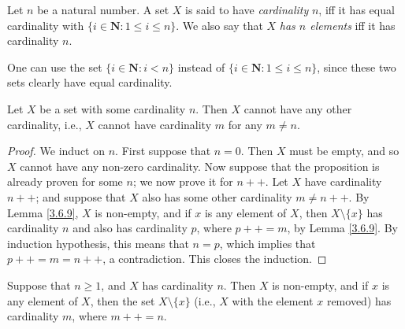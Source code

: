 \begin{definition}\label{3.6.5}
Let \(n\) be a natural number.
A set \(X\) is said to have \emph{cardinality} \(n\), iff it has equal cardinality with \(\{i \in \mathbf{N} : 1 \leq i \leq n\}\).
We also say that \(X\) \emph{has \(n\) elements} iff it has cardinality \(n\).
\end{definition}

\begin{remark}\label{3.6.6}
One can use the set \(\{i \in \mathbf{N} : i < n\}\) instead of \(\{i \in \mathbf{N} : 1 \leq i \leq n\}\), since these two sets clearly have equal cardinality.
\end{remark}

\setcounter{theorem}{7}
\begin{proposition}\label{3.6.8}
Let \(X\) be a set with some cardinality \(n\).
Then \(X\) cannot have any other cardinality, i.e., \(X\) cannot have cardinality \(m\) for any \(m \neq n\).
\end{proposition}

\begin{proof}
We induct on \(n\).
First suppose that \(n = 0\).
Then \(X\) must be empty, and so \(X\) cannot have any non-zero cardinality.
Now suppose that the proposition is already proven for some \(n\);
we now prove it for \(n++\).
Let \(X\) have cardinality \(n++\);
and suppose that \(X\) also has some other cardinality \(m \neq n++\).
By Lemma \ref{3.6.9}, \(X\) is non-empty, and if \(x\) is any element of \(X\), then \(X \setminus \{x\}\) has cardinality \(n\) and also has cardinality \(p\), where \(p++ = m\), by Lemma \ref{3.6.9}.
By induction hypothesis, this means that \(n = p\), which implies that \(p++ = m = n++\), a contradiction.
This closes the induction.
\end{proof}

\begin{lemma}\label{3.6.9}
Suppose that \(n \geq 1\), and \(X\) has cardinality \(n\).
Then \(X\) is non-empty, and if \(x\) is any element of \(X\), then the set \(X \setminus \{x\}\) (i.e., \(X\) with the element \(x\) removed) has cardinality \(m\), where \(m++ = n\).
\end{lemma}

